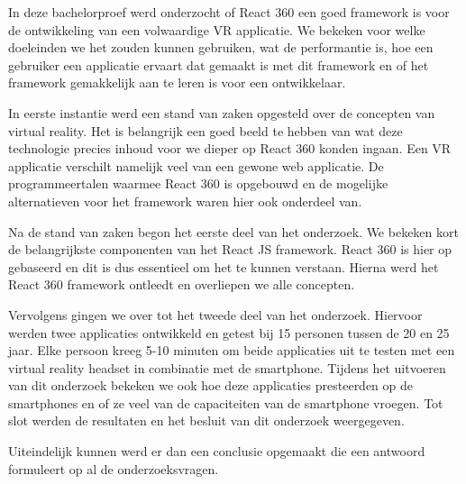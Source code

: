 In deze bachelorproef werd onderzocht of React 360 een goed framework is voor de ontwikkeling van een volwaardige VR applicatie. We bekeken voor welke doeleinden we het zouden kunnen gebruiken, wat de performantie is, hoe een gebruiker een applicatie ervaart dat gemaakt is met dit framework en of het framework gemakkelijk aan te leren is voor een ontwikkelaar.

In eerste instantie werd een stand van zaken opgesteld over de concepten van virtual reality. Het is belangrijk een goed beeld te hebben van wat deze technologie precies inhoud voor we dieper op React 360 konden ingaan. Een VR applicatie verschilt namelijk veel van een gewone web applicatie. De programmeertalen waarmee React 360 is opgebouwd en de mogelijke alternatieven voor het framework waren hier ook onderdeel van.

Na de stand van zaken begon het eerste deel van het onderzoek. We bekeken kort de belangrijkste componenten van het React JS framework. React 360 is hier op gebaseerd en dit is dus essentieel om het te kunnen verstaan. Hierna werd het React 360 framework ontleedt en overliepen we alle concepten.

Vervolgens gingen we over tot het tweede deel van het onderzoek. Hiervoor werden twee applicaties ontwikkeld en getest bij 15 personen tussen de 20 en 25 jaar. Elke persoon kreeg 5-10 minuten om beide applicaties uit te testen met een virtual reality headset in combinatie met de smartphone. Tijdens het uitvoeren van dit onderzoek bekeken we ook hoe deze applicaties presteerden op de smartphones en of ze veel van de capaciteiten van de smartphone vroegen. Tot slot werden de resultaten en het besluit van dit onderzoek weergegeven.

Uiteindelijk kunnen werd er dan een conclusie opgemaakt die een antwoord formuleert op al de onderzoeksvragen.
